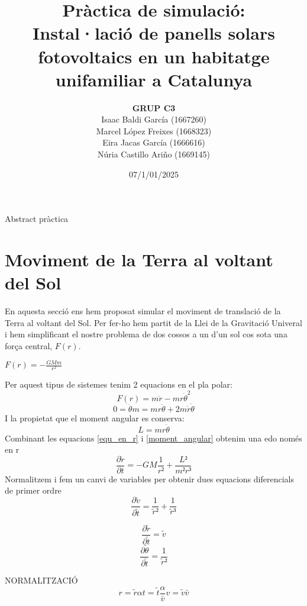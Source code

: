 \documentclass[11pt]{article}
\title{\Huge\bfseries Pràctica de simulació: \\ Instal·lació de panells solars fotovoltaics en un habitatge unifamiliar a Catalunya \\ [2ex] \Large}
\author{\begin{tabular}{c}
\textbf{GRUP C3} \\
Isaac Baldi García (1667260)\\
Marcel López Freixes (1668323) \\
Eira Jacas García (1666616) \\
Núria Castillo Ariño (1669145)
\end{tabular}}
\date{07/1/01/2025}
\begin{document}
\maketitle

Abstract pràctica 

\section{Moviment de la Terra al voltant del Sol} 
En aquesta secció ens hem proposat simular el moviment de translació de la Terra al voltant del Sol. Per fer-ho hem partit de la Llei de la Gravitació Univeral i hem simplificant el nostre problema de dos cossos a un d'un sol cos sota una força central, $F(r)$.

$F(r)=-\frac{GMm}{r^2}$

Per aquest tipus de sistemes tenim 2 equacions en el pla polar:
\begin{equation}
    F(r)=m\ddot{r}-mr{\dot{\theta}}^2
    \label{equ_en_r}
\end{equation}
\begin{equation}
    0=\ddot{\theta}m=mr\ddot{\theta}+2m\dot{r}\dot{\theta}
    \label{equ_en_theta}
\end{equation}
I la propietat que el moment angular es conserva: 
\begin{equation}
    L=mr\dot{\theta}
    \label{moment_angular}
\end{equation}
Combinant les equacions \eqref{equ_en_r} i \eqref{moment_angular} obtenim una edo només en r
\begin{equation}
    \frac{\partial\dot{r}}{\partial t}=-GM\frac{1}{r²}+\frac{L²}{m²r³}
\end{equation}
Normalitzem i fem un canvi de variables per obtenir dues equacions diferencials de primer ordre 
\begin{equation}
    \frac{\partial\tilde{v}}{\partial\tilde{t}}=\frac{1}{\tilde{r}²}+\frac{1}{\tilde{r}³}
    \label{1_edo_r}
\end{equation}

\begin{equation}
    \frac{\partial\tilde{r}}{\partial\tilde{t}}=\tilde{v}
    \label{2_edo_r}
\end{equation}
\begin{equation}
    \frac{\partial\tilde{\theta}}{\partial\tilde{t}}=\frac{1}{\tilde{r}²}
    \label{edo_tetha}
\end{equation}

NORMALITZACIÓ
\begin{equation}
    r=\tilde{r}\alpha
    t=\tilde{t}\frac{\alpha}{\bar{v}}
    v=\tilde{v}\bar{v}
\end{equation}
\end{document}
